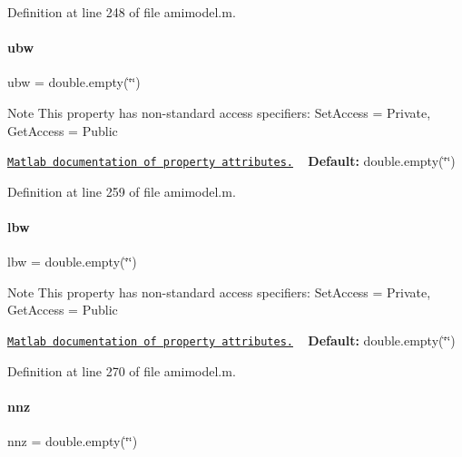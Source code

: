Definition at line 248 of file amimodel.\+m.

\mbox{\label{classamimodel_a955c9d10635afed4ebc04c60010e5d40}} 
\paragraph{\texorpdfstring{ubw}{ubw}}
{\footnotesize\ttfamily ubw = double.\+empty(\char`\"{}\char`\"{})}

\begin{DoxyNote}{Note}
This property has non-\/standard access specifiers\+: {\ttfamily Set\+Access = Private, Get\+Access = Public} 

\href{http://www.mathworks.com/help/matlab/matlab_oop/property-attributes.html}{\tt Matlab documentation of property attributes.} ~\newline
{\bfseries Default\+:} double.\+empty(\char`\"{}\char`\"{}) 
\end{DoxyNote}


Definition at line 259 of file amimodel.\+m.

\mbox{\label{classamimodel_a784f5fb2b8eda576179be087c2a09a39}} 
\paragraph{\texorpdfstring{lbw}{lbw}}
{\footnotesize\ttfamily lbw = double.\+empty(\char`\"{}\char`\"{})}

\begin{DoxyNote}{Note}
This property has non-\/standard access specifiers\+: {\ttfamily Set\+Access = Private, Get\+Access = Public} 

\href{http://www.mathworks.com/help/matlab/matlab_oop/property-attributes.html}{\tt Matlab documentation of property attributes.} ~\newline
{\bfseries Default\+:} double.\+empty(\char`\"{}\char`\"{}) 
\end{DoxyNote}


Definition at line 270 of file amimodel.\+m.

\mbox{\label{classamimodel_a825ec588729c090ff51ea3473dcbc6b9}} 
\paragraph{\texorpdfstring{nnz}{nnz}}
{\footnotesize\ttfamily nnz = double.\+empty(\char`\"{}\char`\"{})}

